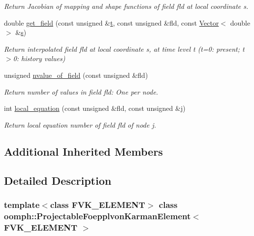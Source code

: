 \begin{DoxyCompactItemize}
\begin{DoxyCompactList}\small\item\em Return Jacobian of mapping and shape functions of field fld at local coordinate s. \end{DoxyCompactList}\item 
double \hyperlink{classoomph_1_1ProjectableFoepplvonKarmanElement_a762989fdeb0489dec57bb386ea6ebf58}{get\+\_\+field} (const unsigned \&\hyperlink{cfortran_8h_af6f0bd3dc13317f895c91323c25c2b8f}{t}, const unsigned \&fld, const \hyperlink{classoomph_1_1Vector}{Vector}$<$ double $>$ \&\hyperlink{cfortran_8h_ab7123126e4885ef647dd9c6e3807a21c}{s})
\begin{DoxyCompactList}\small\item\em Return interpolated field fld at local coordinate s, at time level t (t=0\+: present; t$>$0\+: history values) \end{DoxyCompactList}\item 
unsigned \hyperlink{classoomph_1_1ProjectableFoepplvonKarmanElement_aef446291cf0c740bc541b770a194d29f}{nvalue\+\_\+of\+\_\+field} (const unsigned \&fld)
\begin{DoxyCompactList}\small\item\em Return number of values in field fld\+: One per node. \end{DoxyCompactList}\item 
int \hyperlink{classoomph_1_1ProjectableFoepplvonKarmanElement_ad4d911152c2f5e648f7f6558e53d4c9b}{local\+\_\+equation} (const unsigned \&fld, const unsigned \&j)
\begin{DoxyCompactList}\small\item\em Return local equation number of field fld of node j. \end{DoxyCompactList}\end{DoxyCompactItemize}
\subsection*{Additional Inherited Members}


\subsection{Detailed Description}
\subsubsection*{template$<$class F\+V\+K\+\_\+\+E\+L\+E\+M\+E\+NT$>$\newline
class oomph\+::\+Projectable\+Foepplvon\+Karman\+Element$<$ F\+V\+K\+\_\+\+E\+L\+E\+M\+E\+N\+T $>$}

